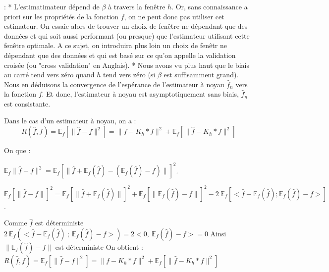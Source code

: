 \documentclass[
]{book}
\begin{document}
\begin{rem}:  
  * L'estimatimateur dépend de $\beta$ à travers la fenêtre $h$. Or, sans   connaissance a priori sur les propriétés de la fonction $f$, on ne peut donc pas utiliser cet estimateur. On essaie alors de trouver un choix de fenêtre ne dépendant que des données et qui soit aussi performant (ou presque) que l'estimateur utilisant cette fenêtre optimale. A ce sujet, on introduira plus loin un choix de fenêtr ne dépendant que des données et qui est basé sur ce qu'on appelle la validation croisée (ou "cross validation" en Anglais).  
  * Nous avons vu plus haut que le biais au carré tend vers zéro quand $h$ tend vers zéro (si $\beta$ est suffisamment grand). Nous en déduisons la convergence de l'espérance de l'estimateur à noyau $\hat {f}_n$ vers la fonction $f$. Et donc, l'estimateur à noyau est asymptotiquement sans biais, $\hat {f}_n$ est consistante.\newline
\end{rem}

\begin{prop}

Dans le cas d'un estimateur à noyau, on a :\newline
$$
R(\hat{f},f)=\mathbb E_f[\parallel\hat{f}-f\parallel^2 ] = \parallel f-K_h*f \parallel^2 + \mathbb E_f[\parallel\hat{f}-K_h*f \parallel^2]
$$
\end{prop}

\begin{demo}
On que :\newline 


$\mathbb E_f\parallel\hat{f}-f \parallel^2 = \mathbb {E}_f[\parallel\hat{f}+\mathbb {E}_f(\hat{f} )-(\mathbb {E}_f(\hat{f} )-f)\parallel ]^2$.\newline

$\mathbb E_f[\parallel\hat{f}-f \parallel]^2 = \mathbb {E}_f[\parallel\hat{f}+\mathbb E_f(\hat{f} )\parallel]^2 +\mathbb {E}_f[\parallel\mathbb {E}_f(\hat{f} )-f\parallel] ^2 - 2~\mathbb {E}_f[<\hat{f}-\mathbb {E}_f(\hat{f});\mathbb {E}_f(\hat{f})-f>]$.\newline

Comme $\hat{f}$ est déterministe\newline 
$2~\mathbb {E}_f(<\hat{f}-\mathbb E_f(\hat{f})~;~\mathbb {E}_f(\hat{f})-f>)=2<0,~\mathbb E_f(\hat{f})-f>=0$\newline
Ainsi $\parallel\mathbb {E}_f(\hat{f} )-f\parallel$ est déterministe\newline
On obtient :\newline
$R(\hat{f},f)=\mathbb {E}_f[\parallel\hat{f}-f\parallel^2 ] = \parallel f-K_h*f \parallel^2 + \mathbb {E}_f[\parallel\hat{f}-K_h*f\parallel^2]$ 
\end{demo}
\end{document}
